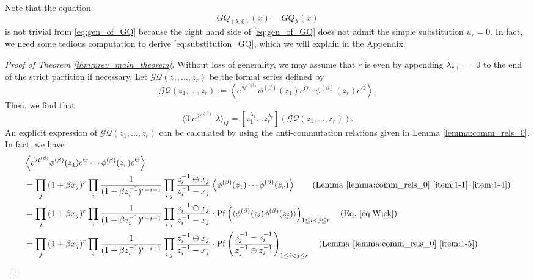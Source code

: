 \documentclass{amsart}
\def\ket#1{\vert #1 \rangle}
\def\bra#1{\langle #1 \vert}
\begin{document}
Note that the equation
\begin{equation}\label{eq:substitution_GQ}
GQ_{(\lambda,0)}(x)
=
GQ_{\lambda}(x)
\end{equation}
is not trivial from \eqref{eq:gen_of_GQ} because the right hand side of \eqref{eq:gen_of_GQ} does not admit the simple substitution $u_{r}=0$.
In fact, we need some tedious computation to derive \eqref{eq:substitution_GQ}, which we will explain in the Appendix.

\begin{proof}[Proof of Theorem \ref{thm:prev_main_theorem}]
Without loss of generality, we may assume that $r$ is even by appending $\lambda_{r+1}=0$ to the end of the strict partition if necessary. 
Let $\mathcal{GQ}(z_1,\dots,z_r)$ be the formal series defined by
\[
\mathcal{GQ}(z_1,\dots,z_r):=\left\langle
e^{\mathcal{H}^{(\beta)}}
\phi^{(\beta)}(z_1)e^{\Theta}
\cdots
\phi^{(\beta)}(z_{r})e^{\Theta}
\right\rangle.
\]
Then, we find that
\begin{equation}\label{eq:GQ_to_GQvector}
\bra{0}e^{\mathcal{H}^{(\beta)}}\ket{\lambda}_Q=[z_1^{\lambda_1}\dots z_r^{\lambda_r}]
\left(\mathcal{GQ}(z_1,\dots,z_r)\right).
\end{equation}
An explicit expression of $\mathcal{GQ}(z_1,\dots,z_r)$ can be calculated by using the anti-commutation relations given in Lemma \ref{lemma:comm_rels_0}.
In fact, we have
\begin{align*}
&
\left\langle
e^{\mathcal{H}^{(\beta)}}
\phi^{(\beta)}(z_1)e^{\Theta}
\cdots
\phi^{(\beta)}(z_{r})e^{\Theta}
\right\rangle\\
&=
\prod_j{(1+\beta x_j)^{r}}
\prod_i\frac{1}{(1+\beta z_i^{-1})^{r-i+1}}
\prod_{i,j}\frac{z_i^{-1}\oplus x_j}{z_i^{-1}-x_j}
\left\langle
\phi^{(\beta)}(z_1)
\cdots
\phi^{(\beta)}(z_{r})
\right\rangle
\qquad (\text{Lemma \ref{lemma:comm_rels_0} \eqref{item:1-1}--\eqref{item:1-4}})
\\
&=
\prod_j{(1+\beta x_j)^{r}}
\prod_i\frac{1}{(1+\beta z_i^{-1})^{r-i+1}}
\prod_{i,j}\frac{z_i^{-1}\oplus x_j}{z_i^{-1}-x_j}
\cdot
\mathrm{Pf}
\left(
\langle
\phi^{(\beta)}(z_i)\phi^{(\beta)}(z_j)
\rangle
\right)_{1\leq i<j\leq r}
\quad (\mathrm{Eq.~\eqref{eq:Wick}})
\allowdisplaybreaks
\\
&=
\prod_j{(1+\beta x_j)^{r}}
\prod_i\frac{1}{(1+\beta z_i^{-1})^{r-i+1}}
\prod_{i,j}\frac{z_i^{-1}\oplus x_j}{z_i^{-1}-x_j}
\cdot
\mathrm{Pf}
\left(
\frac{z_j^{-1}-z_i^{-1}}{z_j^{-1}\oplus z_i^{-1}}
\right)_{1\leq i<j\leq r}
\quad (\mathrm{Lemma~\ref{lemma:comm_rels_0}~\eqref{item:1-5}})
\allowdisplaybreaks

\end{align*}
\end{proof}
\end{document}
